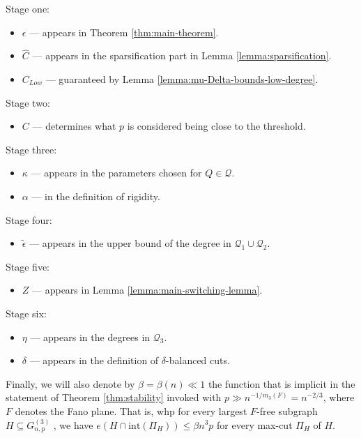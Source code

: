 \documentclass[11pt,a4paper,oneside,reqno]{amsart}
\newcommand{\Gnp}{G_{n, p}^{(3)}}
\newcommand{\cQ}{\mathcal{Q}}
\newcommand{\1}{\mathbbm{1}} %
\renewcommand{\le}{\leqslant}
\renewcommand{\int}{\mathrm{int}}
\begin{document}
Stage one:
\begin{itemize}
    \item $\epsilon$ --- appears in Theorem \ref{thm:main-theorem}.    
    \item $\hat{C}$ --- appears in the sparsification part in Lemma \ref{lemma:sparsification}.
    \item $C_{Low}$ --- guaranteed by Lemma \ref{lemma:mu-Delta-bounds-low-degree}.    
\end{itemize}

Stage two:
\begin{itemize}
\item $C$ --- determines what $p$ is considered being close to the threshold.        
\end{itemize}

Stage three:
\begin{itemize}        
    \item $\kappa$ --- appears in the parameters chosen for $Q \in \cQ$.
    \item $\alpha$ --- in the definition of rigidity. 
\end{itemize}

Stage four:
\begin{itemize}
    \item $\tilde{\epsilon}$ --- appears in the upper bound of the degree in $\cQ_1 \cup \cQ_2$.
\end{itemize}

Stage five:
\begin{itemize}
    \item $Z$ --- appears in Lemma \ref{lemma:main-switching-lemma}. 
\end{itemize}

Stage six:
\begin{itemize}
    \item $\eta$ --- appears in the degrees in $\cQ_3$.
    \item $\delta$ --- appears in the definition of $\delta$-balanced cuts.
\end{itemize}

Finally, we will also denote by $\beta = \beta(n) \ll 1$ the function that is implicit in the statement of Theorem \ref{thm:stability} invoked with $p \gg n^{-1/m_3(F)} = n^{-2/3}$, where $F$ denotes the Fano plane. That is, whp for every largest $F$-free subgraph $H \subseteq \Gnp$ , we have $e(H \cap \int(\Pi_H)) \le \beta n^3 p$ for every max-cut $\Pi_H$ of $H$.
\end{document}
